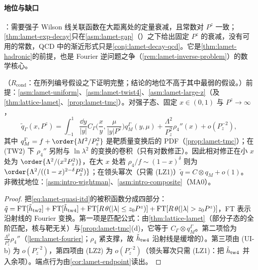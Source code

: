 \paragraph{地位与缺口}
\tagC：需要强子 Wilson 线关联函数在大距离处的定量衰减，且常数对 $P^z$ 一致；\cref{thm:lamet-exp-decay}只在\cref{asm:lamet-gap}（\tagC）之下给出固定 $P^z$ 的衰减，没有可用的常数，QCD 中的渐近形式只是\cref{conj:lamet-decay-qcd}。它是\cref{thm:lamet-hadronic}的前提，也是 Fourier 逆问题之争（\cref{rem:lamet-inverse-problem}）的数学核心。

\begin{theorem}\label{thm:lamet-hadronic}
（$R_{\mathrm{cond}}$：在所列编号假设之下证明完整；结论的地位不高于其中最弱的假设。）前提：\cref{asm:lamet-uniform}、\cref{asm:lamet-twist4}、\cref{asm:lamet-large-z}（及 \cref{thm:lattice-lamet}、\cref{prop:lamet-tmc}）。对强子态、固定 $x\in(0,1)$ 与 $P^z\to\infty$，
\begin{equation}\label{eq:lamet-hadronic}
\tilde q_\Gamma(x,P^z)=\int_{-1}^1\frac{\dd y}{|y|}C_\Gamma\Big(\frac xy,\frac\mu{|y|P^z}\Big)q^\Gamma_M(y,\mu)+\frac{\Lambda^2}{P_z^2}\rho_4''(x)+o(P_z^{-2}),
\end{equation}
其中 $q^\Gamma_M=f+\order{M^2/P_z^2}$ 是靶质量变换后的 PDF（\cref{prop:lamet-tmc}）；在 (TW2) 下 $\rho_4''$ 另附与 $\ln\lambda^2$ 的变换的卷积（只有对数修正）。因此相对修正在小 $x$ 处为 $\order{\Lambda^2/(x^2P_z^2)}$，在大 $x$ 处若 $\rho_4/f\sim(1-x)^\delta$ 则为 $\order{\Lambda^2/((1-x)^{2-\delta}P_z^2)}$；在领头幂次（只需 (LZ1)）$\tilde q=C\otimes q_M+o(1)$。
非微扰地位：\cref{asm:intro-wightman}、\cref{asm:intro-composite}（MA0）。
\end{theorem}

\begin{proof}
把\cref{eq:lamet-quasi-itd}的被积函数分成四部分：$\tilde q={\rm FT}[\tilde h_{\rm tw2}]+{\rm FT}[\tilde h_{\rm tw4}]+{\rm FT}[R\,\theta(|\lambda|\le z_0P^z)]+{\rm FT}[R\,\theta(|\lambda|>z_0P^z)]$，FT 表示沿射线的 Fourier 变换。第一项是匹配公式：由\cref{thm:lattice-lamet}（部分子态的全阶匹配，核与靶无关）与\cref{prop:lamet-tmc}(d)，它等于 $C_\Gamma\otimes q^\Gamma_M$。第二项恰为 $\frac{\Lambda^2}{P_z^2}\rho_4''$（\cref{lem:lamet-fourier}；$\rho_4$ 紧支撑，故 $\tilde h_{\rm tw4}$ 沿射线是缓增的）。第三项由 (UI-b) 为 $o(P_z^{-2})$，第四项由 (LZ2) 为 $o(P_z^{-2})$（领头幂次只需 (LZ1)：把 $\tilde h_{\rm tw4}$ 并入余项）。端点行为由\cref{cor:lamet-endpoint}读出。
\end{proof}

